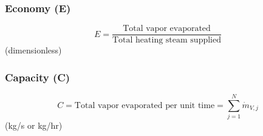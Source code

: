\subsubsection*{Economy (E)}
\begin{equation}
    E = \frac{\text{Total vapor evaporated}}{\text{Total heating steam supplied}}
\end{equation}
(dimensionless)

\subsubsection*{Capacity (C)}
\begin{equation}
    C = \text{Total vapor evaporated per unit time} = \sum_{j=1}^{N} \dot{m}_{V,j}
\end{equation}
(kg/s or kg/hr)
